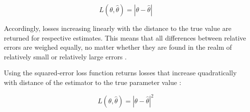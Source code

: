         \begin{equation}\label{eq:AbsLossFunction}
        L(\theta,\hat{\theta}) = |\theta - \hat{\theta}|
        \end{equation}        
        
        Accordingly, losses increasing linearly with the distance to the true value are returned for respective estimates. This means that all differences between relative errors are weighed equally, no matter whether they are found in the realm of relatively small or relatively large errors \citep{hennig2007}.
        
        Using the squared-error loss function returns losses that increase quadratically with distance of the estimator to the true parameter value \citep{davidson2015}:
        
        \begin{equation}\label{eq:SqrLossFunction}
        L(\theta,\hat{\theta}) = |\theta - \hat{\theta}|^2
        \end{equation}        
        

